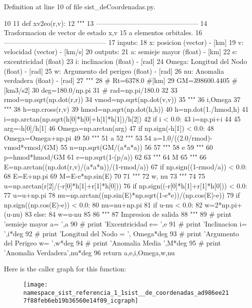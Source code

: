 \-Definition at line 10 of file sist\-\_\-de\-Coordenadas.\-py.


\begin{DoxyCode}
10 
11 def xv2eo(r,v):
12     """
13     ---------------------------------------------
14     Trasformacion de vector de estado x,v
15     a elementos orbitales.
16     ---------------------------------------------
17     inputs:
18         x: posicion (vector) - [km]
19         v: velocidad (vector) - [km/s]
20     outputs:
21         a: semieje mayor (float) - [km]
22         e: excentricidad (float)
23         i: inclinacion (float) - [rad]
24         Omega: Longitud del Nodo (float) - [rad]
25         w: Argumento del perigeo (float) - [rad]
26         nu: Anomalia verdadera (float) - [rad]
27     """
28 #    Rt=6378.0 #[km]
29     GM=398600.4405 #[km3/s2]
30     deg=180.0/np.pi 
31 #    rad=np.pi/180.0
32     
33     rmod=np.sqrt(np.dot(r,r))
34     vmod=np.sqrt(np.dot(v,v))
35     """
36     i,Omega
37     """
38     h=np.cross(r,v)
39     hmod=np.sqrt(np.dot(h,h))
40     h=np.dot(1./hmod,h)
41     i=np.arctan(np.sqrt(h[0]*h[0]+h[1]*h[1])/h[2])
42     if i < 0.0:
43         i=np.pi+i
44         
45     arg=-h[0]/h[1]
46     Omega=np.arctan(arg)
47     if np.sign(-h[1]) < 0.0:
48         Omega=Omega+np.pi
49 
50     """
51      a
52     """
53      
54     a=1.0/((2.0/rmod)-vmod*vmod/GM)
55     n=np.sqrt(GM/(a*a*a))
56     
57     """
58      e
59     """
60     p=hmod*hmod/GM
61     e=np.sqrt(1-(p/a))
62     
63     """
64      M    
65     """
66     E=np.arctan((np.dot(r,v)/(a*a*n))/(1-rmod/a))
67     if np.sign((1-rmod/a)) < 0.0:
68         E=E+np.pi
69     M=E-e*np.sin(E)
70 
71     """
72      w, nu
73     """
74 
75     u=np.arctan(r[2]/(-r[0]*h[1]+r[1]*h[0]))
76     if np.sign((-r[0]*h[1]+r[1]*h[0])) < 0.0:
77         u=u+np.pi
78     nu=np.arctan((np.sin(E)*np.sqrt(1-e*e))/(np.cos(E)-e))
79     if np.sign((np.cos(E)-e)) < 0.0:
80         nu=nu+np.pi
81     if u-nu < 0.0:
82         w=2*np.pi+(u-nu)
83     else:
84         w=u-nu
85     
86     """
87     Impresion de salida
88     """
89 #     print 'semieje mayor a= ',a
90 #     print 'Excentricidad e= ',e
91 #     print 'Inclinacion i= ',i*deg
92 #     print 'Longitud del Nodo = ', Omega*deg
93 #     print 'Argumento del Perigeo w= ',w*deg
94 #     print 'Anomalia Media ',M*deg
95 #     print 'Anomalia Verdadera',nu*deg
96     return a,e,i,Omega,w,nu
    
\end{DoxyCode}


\-Here is the caller graph for this function\-:\nopagebreak
\begin{figure}[H]
\begin{center}
\leavevmode
\texttt{[image: namespace\_sist\_referencia\_1\_1sist\_\_de\_coordenadas\_ad986ee217f88feb6eb19b36560e14f09\_icgraph]}
\end{center}
\end{figure}




